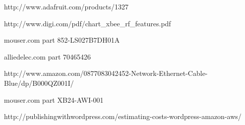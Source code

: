 \documentclass[ppfs.tex]{template/subfiles}
\begin{document}
\begin{thebibliography}{}
http://www.adafruit.com/products/1327

http://www.digi.com/pdf/chart\_xbee\_rf\_features.pdf

mouser.com part 852-LS027B7DH01A

alliedelec.com part 70465426 

http://www.amazon.com/0877083042452-Network-Ethernet-Cable-Blue/dp/B000QZ001I/

mouser.com part XB24-AWI-001

http://publishingwithwordpress.com/estimating-costs-wordpress-amazon-aws/

\end{thebibliography}
\end{document}
